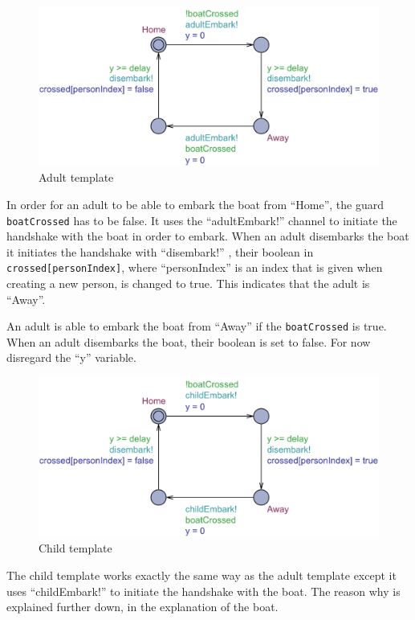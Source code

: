 \documentclass[a4paper,12pt]{article}
\begin{document}
\begin{figure}[H]
\centering
\includegraphics[width=\linewidth]{Adult.pdf}
\caption{Adult template}
\label{fig:adult}
\end{figure}

In order for an adult to be able to embark the boat from ``Home'', the guard \lstinline|boatCrossed| has to be false.  It uses the ``adultEmbark!'' channel to initiate the handshake with the boat in order to embark. When an adult disembarks the boat it initiates the handshake with ``disembark!'' , their boolean in \lstinline|crossed[personIndex]|, where ``personIndex'' is an index that is given when creating a new person, is changed to true. This indicates that the adult is ``Away''. 

An adult is able to embark the boat from ``Away'' if the \lstinline|boatCrossed| is true. When an adult disembarks the boat, their boolean is set to false. For now disregard the ``y'' variable. 

\begin{figure}[H]
\centering
\includegraphics[width=\linewidth]{Child.pdf}
\caption{Child template}
\label{fig:child}
\end{figure}

The child template works exactly the same way as the adult template except it uses ``childEmbark!'' to initiate the handshake with the boat. The reason why is explained further down, in the explanation of the boat.
\end{document}

